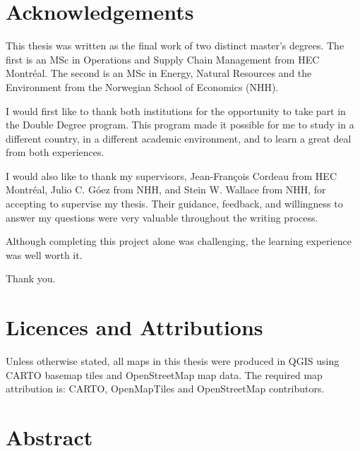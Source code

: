 \documentclass[12pt]{article}
\begin{document}
\onehalfspacing

\section{Acknowledgements}
\label{sec:acknowledgements}

This thesis was written as the final work of two distinct master's degrees. The first is an MSc in Operations and Supply Chain Management from HEC Montréal. The second is an MSc in Energy, Natural Resources and the Environment from the Norwegian School of Economics (NHH).

I would first like to thank both institutions for the opportunity to take part in the Double Degree program. This program made it possible for me to study in a different country, in a different academic environment, and to learn a great deal from both experiences.

I would also like to thank my supervisors, Jean-François Cordeau from HEC Montréal, Julio C. Góez from NHH, and Stein W. Wallace from NHH, for accepting to supervise my thesis. Their guidance, feedback, and willingness to answer my questions were very valuable throughout the writing process.

Although completing this project alone was challenging, the learning experience was well worth it.

Thank you.

\section{Licences and Attributions}
\label{sec:licenses-and-attributions}

Unless otherwise stated, all maps in this thesis were produced in QGIS using CARTO basemap tiles and OpenStreetMap map data. The required map attribution is: \textcopyright{} CARTO, \textcopyright{} OpenMapTiles and \textcopyright{} OpenStreetMap contributors.

\section{Abstract}
\label{sec:abstract}
\end{document}
